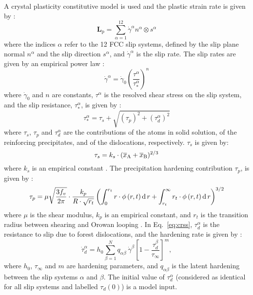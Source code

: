\documentclass[11pt]{scrartcl}
\newcommand{\eref}[1]{Eq.~\eqref{#1}}
\newcommand{\tnsr}[1]{\ensuremath{\mathbf{#1}}}
\newcommand{\inc}[1]{\ensuremath{\text d\,{#1}}}
\newcommand{\Lp}[1][]{\ensuremath{\tnsr L_\text{p#1}}}
\begin{document}
A crystal plasticity constitutive model is used and the plastic strain rate is given by \cite{Roters2019a}:
%
\begin{equation}
\label{eq: lp}
\Lp = \sum_{\alpha = 1}^{12} \dot{\gamma}^{\alpha} n^{\alpha} \otimes s^{\alpha} 
\end{equation}
where the indices $\alpha$ refer to the 12 FCC slip systems, defined by the slip plane normal $n^{\alpha}$ and the slip direction $s^{\alpha}$, and $\dot{\gamma}^{\alpha}$ is the slip rate.
The slip rates are given by an empirical power law  \cite{Roters2010}:
%
\begin{equation}
\label{eq:sliprate}
\dot{\gamma}^{\alpha} = \dot{\gamma}_0\left(\frac{\tau^{\alpha}}{\tau_{*}^{\alpha} }\right)^{n}
\end{equation}
%
where \hypertarget{gamma_0}{$\dot{\gamma}_0$} and \hypertarget{nsl}{$n$} are constants, $\tau^{\alpha}$ is the resolved shear stress on the slip system, and the slip resistance, $\tau_{*}^{\alpha}$, is given by \cite{Deschamps1998c}:
\begin{equation}
\label{eq:crss}
\tau_{*}^{\alpha} = \tau_{s} + \sqrt{(\tau_{p})^{2}+(\tau_{d}^{\alpha})^{2}}
\end{equation}
where $\tau_{s}$, $\tau_{p}$ and $\tau_{d}^{\alpha}$ are the contributions of the atoms in solid solution, of the reinforcing precipitates, and of the dislocations, respectively. $\tau_{s}$ is given by:
\begin{equation}
\label{eq:tau_s}
\tau_{s} = k_{s} \cdot (\overline{x}_{ \tiny \textrm{A}}+\overline{x}_{ \tiny \textrm{B}})^{2/3}
\end{equation}
where \hypertarget{ks}{$k_{s}$} is an empirical constant \cite{Deschamps1998c}. The precipitation hardening contribution $\tau_{p}$, is given by \cite{Deschamps1998c}:
\begin{equation}
\label{eq:precipitatehardening}
\tau_{p}= \mu \sqrt{\frac{3 f_{v}}{2 \pi}} \cdot  \frac{k_{p}}{ R  \cdot \sqrt{r_{t}} }\left( \int_{0}^{r_{t}}  r \cdot \phi\left(r,t\right) \inc{r} + \int_{r_{t}}^{\infty} r_{t}  \cdot \phi\left(r,t\right) \inc{r} \right)^{3/2}
\end{equation}
%
where \hypertarget{mu}{$\mu$} is the shear modulus, \hypertarget{kp}{$k_{p}$} is an empirical constant, and \hypertarget{rt}{$r_{t}$} is the transition radius between shearing and Orowan looping \cite{Hull2011}. 
In \eref{eq:crss}, $\tau_{d}^{\alpha}$ is the resistance to slip due to forest dislocations, and the hardening rate is given by \cite{Roters2010}:
\begin{equation}
\label{eq:strainhardening}
\dot{\tau}_d^{\alpha} = h_0 \sum_{\beta = 1}^{N}q_{\alpha\beta}\ \dot{\gamma}^{\beta}\left[1 - \frac{\tau_d^{\beta}}{\tau_{\infty}}\right]^{m},
\end{equation}
where \hypertarget{h0}{$h_{0}$}, \hypertarget{tauinfinity}{$\tau_{\infty}$} and \hypertarget{m}{$m$} are hardening parameters, and \hypertarget{q}{$q_{\alpha\beta}$} is the latent hardening between the slip systems $\alpha$ and $\beta$. The initial value of ${\tau}_d^{\alpha}$ (considered as identical for all slip systems and labelled \hypertarget{tau_d_alpha}{${\tau}_d(0)$}) is a model input.
\end{document}
